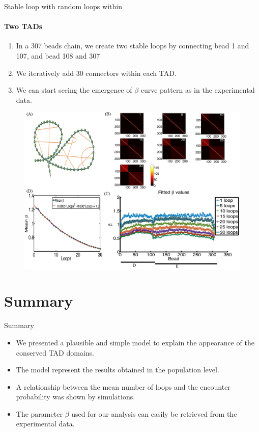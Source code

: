 \documentclass[8pt]{beamer}
\begin{document}
\begin{frame}{Stable loop with random loops within}
\framesubtitle{Two TADs}
\begin{enumerate}
\item In a 307 beads chain, we create two stable loops by connecting bead 1 and 107, and bead 108 and 307
\item We iteratively add 30 connectors within each TAD.
\item We can start seeing the emergence of $\beta$ curve pattern as in the experimental data.
\end{enumerate}
\begin{figure}[H]
\includegraphics[scale=0.35]{Figure04_TwoTADs0To30RandomLoops307Beads}
\end{figure}
\end{frame}


\section{Summary}\label{section_summaryAndFutureWork}

\begin{frame}{Summary}
\begin{itemize}
\item We presented a plausible and simple model to explain the appearance of the conserved TAD domains. 
\item The model represent the results obtained in the population level.
\item A relationship between the mean number of loops and the encounter probability was shown by simulations.
\item The parameter $\beta$ used for our analysis can easily be retrieved from the experimental data. 
\end{itemize}
\end{frame}
\end{document}

